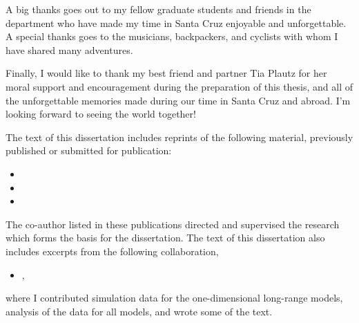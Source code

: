 \documentclass[phd]{ucbthesis}
\begin{document}
\begin{frontmatter}
\begin{acknowledgements}
  A big thanks goes out to my fellow graduate students and friends in the
  department who have made my time in Santa Cruz enjoyable and unforgettable. A
  special thanks goes to the musicians, backpackers, and cyclists with whom I
  have shared many adventures.

  Finally, I would like to thank my best friend and partner Tia Plautz for her
  moral support and encouragement during the preparation of this thesis, and
  all of the unforgettable memories made during our time in Santa Cruz and
  abroad. I'm looking forward to seeing the world together!

  The text of this dissertation includes reprints of the following material,
  previously published or submitted for publication:
  \begin{itemize}
    \item{}
    \item{}
    \item{}
  \end{itemize}
  The co-author listed in these publications directed and supervised the
  research which forms the basis for the dissertation. The text of this
  dissertation also includes excerpts from the following collaboration,
  \begin{itemize}
    \item{},
  \end{itemize}
  where I contributed simulation data for the one-dimensional long-range
  models, analysis of the data for all models, and wrote some of the text.
\end{acknowledgements}
\end{frontmatter}

\pagestyle{headings}

\DoubleSpacing








%

\SingleSpacing

\printbibliography
\end{document}
